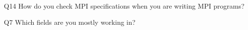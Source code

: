 \begin{description}%
\item{Q14} How do you check MPI specifications when you are writing MPI programs?%
\item{Q7} Which fields are you mostly working in?%
\end{description}%
